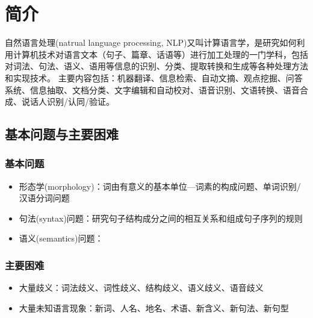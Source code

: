 
\section{简介}
自然语言处理(natrual language processing, NLP)又叫计算语言学，是研究如何利用计算机技术对语言文本（句子、篇章、话语等）进行加工处理的一门学科，包括对词法、句法、语义、语用等信息的识别、分类、提取转换和生成等各种处理方法和实现技术。
主要内容包括：机器翻译、信息检索、自动文摘、观点挖掘、问答系统、信息抽取、文档分类、文字编辑和自动校对、语音识别、文语转换、语音合成、说话人识别/认同/验证。

\subsection{基本问题与主要困难}
\subsubsection{基本问题}
\begin{itemize}
\item 形态学(morphology)：词由有意义的基本单位---词素的构成问题、单词识别/汉语分词问题
\item 句法(syntax)问题：研究句子结构成分之间的相互关系和组成句子序列的规则
\item 语义(semantics)问题：
\end{itemize}

\subsubsection{主要困难}
\begin{itemize}
	\item 大量歧义：词法歧义、词性歧义、结构歧义、语义歧义、语音歧义
	\item 大量未知语言现象：新词、人名、地名、术语、新含义、新句法、新句型
\end{itemize}


